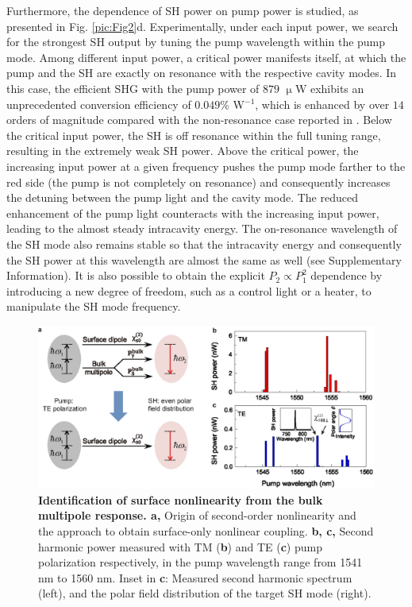 \documentclass[a4paper,8pt,hyperref, twocolumn, aps, prl]{article}
\begin{document}
Furthermore, the dependence of SH power on pump power is studied, as presented in Fig. \ref{pic:Fig2}d.
Experimentally, under each input power, we search for the strongest SH output by tuning the pump wavelength within the pump mode.
Among different input power, a critical power manifests itself, at which the pump and the SH are exactly on resonance with the respective cavity modes.
In this case, the efficient SHG with the pump power of $879$ $\upmu$W exhibits an unprecedented conversion efficiency of $0.049\%$ W$^{-1}$, which is enhanced by over $14$ orders of magnitude compared with the non-resonance case reported in \cite{tian2014recent}.
Below the critical input power, the SH is off resonance within the full tuning range, resulting in the extremely weak SH power.
Above the critical power, the increasing input power at a given frequency pushes the pump mode farther to the red side (the pump is not completely on resonance) and consequently increases the detuning between the pump light and the cavity mode.
The reduced enhancement of the pump light counteracts with the increasing input power, leading to the almost steady intracavity energy.
The on-resonance wavelength of the SH mode also remains stable so that the intracavity energy and consequently the SH power at this wavelength are almost the same as well (see Supplementary Information).
It is also possible to obtain the explicit $P_2 \propto P_1^2$ dependence by introducing a new degree of freedom, such as a control light or a heater, to manipulate the SH mode frequency.

\begin{figure}[!ht]
\centering
\includegraphics[width=16cm]{Fig3new.eps}
\caption{\textbf{Identification of surface nonlinearity from the bulk multipole response. a, }Origin of second-order nonlinearity and the approach to obtain surface-only nonlinear coupling. \textbf{b, c,} Second harmonic power measured with TM (\textbf{b}) and TE (\textbf{c}) pump polarization respectively, in the pump wavelength range from 1541 nm to 1560 nm. Inset in \textbf{c}: Measured second harmonic spectrum (left), and the polar field distribution of the target SH mode (right).}
\label{pic:Fig3}
\end{figure}
\end{document}

